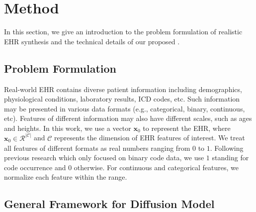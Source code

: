 \section{Method}

In this section, we give an introduction to the problem formulation of realistic EHR synthesis and the technical details of our proposed \modelname. 

\subsection{Problem Formulation}

Real-world EHR contains diverse patient information including demographics, physiological conditions, laboratory results, ICD codes, etc. 
Such information may be presented in various data formats (e.g., categorical, binary, continuous, etc). Features of different information may also have different scales, such as ages and heights. 
In this work, we use a vector $\boldsymbol{x}_0$ to represent the EHR, where $\boldsymbol{x}_0\in \mathcal{R}^ {|\mathcal{C}|}$ and $\mathcal{C}$ represents the dimension of EHR features of interest. 
We treat all features of different formats as real numbers ranging from $0$ to $1$. 
Following previous research \citep{pmlr-v68-choi17a,medbgan} which only focused on binary code data, we use $1$ standing for code occurrence and $0$ otherwise.
For continuous and categorical features, we normalize each feature within the range. 

\subsection{General Framework for Diffusion Model}

